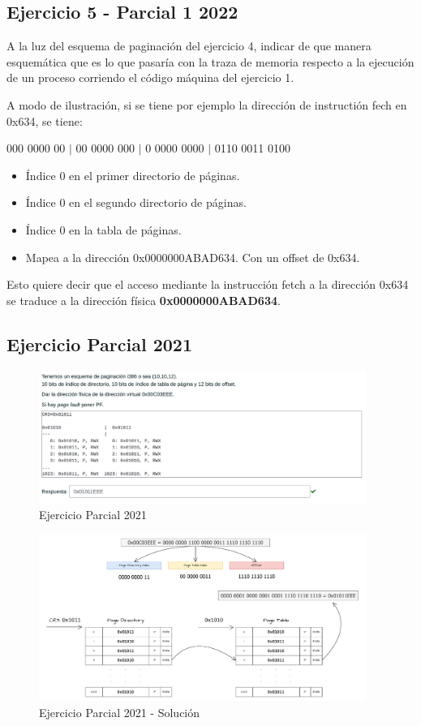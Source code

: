 \documentclass{article}
\begin{document}
\subsection{Ejercicio 5 - Parcial 1 2022}
A la luz del esquema de paginación del ejercicio 4, indicar de que manera esquemática que es lo que pasaría con la traza de memoria respecto a la ejecución de un proceso corriendo el código máquina del ejercicio 1.

A modo de ilustración, si se tiene por ejemplo la dirección de instructión fech en 0x634, se tiene:

000 0000 00 $|$ 00 0000 000 $|$ 0 0000 0000 $|$ 0110 0011 0100 
\begin{itemize}
    \item Índice 0 en el primer directorio de páginas.
    \item Índice 0 en el segundo directorio de páginas.
    \item Índice 0 en la tabla de páginas.
    \item Mapea a la dirección 0x0000000ABAD634. Con un offset de 0x634.
\end{itemize}

Esto quiere decir que el acceso mediante la instrucción fetch a la dirección 0x634 se traduce a la dirección física \textbf{0x0000000ABAD634}.
\newpage
\subsection{Ejercicio Parcial 2021}

\begin{figure}[h]
    \centering
    \includegraphics[width=0.95\textwidth]{src/ejercicio2021.png}
    \caption{Ejercicio Parcial 2021}
\end{figure}

\begin{figure}[h]
    \centering
    \includegraphics[width=0.95\textwidth]{src/2021.pdf}
    \caption{Ejercicio Parcial 2021 - Solución}
\end{figure}
\end{document}

